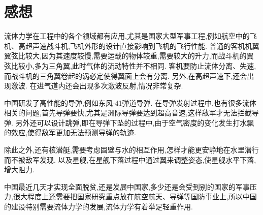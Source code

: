 \documentclass[12pt]{article}
\begin{document}
\section{感想}



流体力学在工程中的各个领域都有应用,尤其是国家大型军事工程,例如航空中的飞机、高超声速战斗机,飞机外形的设计直接影响到飞机的飞行性能. 普通的客机机翼翼弦比较大,因为其速度较慢,需要运载的物体较重,需要较大的升力,而战斗机的翼弦比较小,多为三角翼,此时气体的流动特性并不相同. 客机要防止流体分离、失速,而战斗机的三角翼卷起的涡必定使得翼面上会有分离. 另外,在高超声速下,还会出现激波. 在进气道内还会出现多次激波反射,情况非常复杂. 


中国研发了高性能的导弹,例如东风-41弹道导弹. 在导弹发射过程中,也有很多流体相关的问题,首先导弹要快,尤其是洲际导弹要达到超高音速,这样敌军才无法拦截导弹. 另外还可以设计跳弹,即在导弹下坠的过程中,由于空气密度的变化发生打水飘的效应,使得敌军更加无法预测导弹的轨迹. 

除此之外,还有核潜艇,需要考虑固壁与水的相互作用,怎样才能更安静地在水里潜行而不被敌军发现. 以及星舰,在星舰下落过程中通过翼来调整姿态,使星舰水平下落,增大阻力. 

中国最近几天才实现全面脱贫,还是发展中国家,多少还是会受到别的国家的军事压力,很大程度上还需要把国家研究重点放在航空航天、导弹等国防事业上,所以中国的建设特别需要流体力学的发展,流体力学有着举足轻重作用. 








\end{document}
